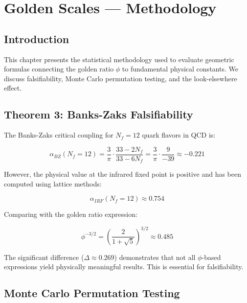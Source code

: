 \chapter{Golden Scales — Methodology}
\label{ch:21}

\section{Introduction}

This chapter presents the statistical methodology used to evaluate geometric formulas connecting the golden ratio $\phi$ to fundamental physical constants. We discuss falsifiability, Monte Carlo permutation testing, and the look-elsewhere effect.

\section{Theorem 3: Banks-Zaks Falsifiability}

\begin{theorem}
The Banks-Zaks critical coupling for $N_f = 12$ quark flavors in QCD is:

\begin{equation}
\alpha_{BZ}(N_f=12) = \frac{3}{\pi} \cdot \frac{33 - 2N_f}{33 - 6N_f} = \frac{3}{\pi} \cdot \frac{9}{-39} \approx -0.221
\end{equation}

However, the physical value at the infrared fixed point is positive and has been computed using lattice methods:

\begin{equation}
\alpha_{IRF}(N_f=12) \approx 0.754
\end{equation}

Comparing with the golden ratio expression:

\begin{equation}
\phi^{-3/2} = \left(\frac{2}{1+\sqrt{5}}\right)^{3/2} \approx 0.485
\end{equation}

The significant difference ($\Delta \approx 0.269$) demonstrates that not all $\phi$-based expressions yield physically meaningful results. This is essential for falsifiability.
\end{theorem}

\section{Monte Carlo Permutation Testing}

